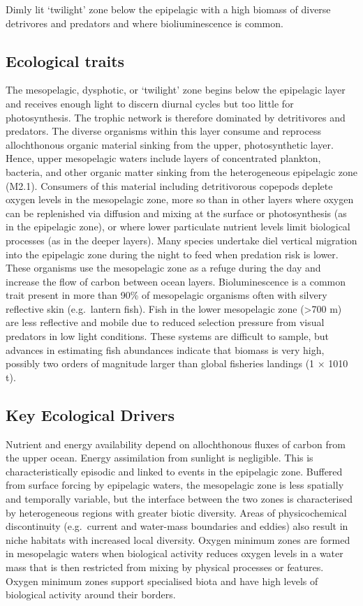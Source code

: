 \documentclass[
  letterpaper,
  DIV=11,
  numbers=noendperiod]{scrartcl}
\begin{document}
Dimly lit `twilight' zone below the epipelagic with a high biomass of
diverse detrivores and predators and where bioliuminescence is common.

\subsection{Ecological traits}\label{ecological-traits-36}

The mesopelagic, dysphotic, or `twilight' zone begins below the
epipelagic layer and receives enough light to discern diurnal cycles but
too little for photosynthesis. The trophic network is therefore
dominated by detritivores and predators. The diverse organisms within
this layer consume and reprocess allochthonous organic material sinking
from the upper, photosynthetic layer. Hence, upper mesopelagic waters
include layers of concentrated plankton, bacteria, and other organic
matter sinking from the heterogeneous epipelagic zone (M2.1). Consumers
of this material including detritivorous copepods deplete oxygen levels
in the mesopelagic zone, more so than in other layers where oxygen can
be replenished via diffusion and mixing at the surface or photosynthesis
(as in the epipelagic zone), or where lower particulate nutrient levels
limit biological processes (as in the deeper layers). Many species
undertake diel vertical migration into the epipelagic zone during the
night to feed when predation risk is lower. These organisms use the
mesopelagic zone as a refuge during the day and increase the flow of
carbon between ocean layers. Bioluminescence is a common trait present
in more than 90\% of mesopelagic organisms often with silvery reflective
skin (e.g.~lantern fish). Fish in the lower mesopelagic zone
(\textgreater700 m) are less reflective and mobile due to reduced
selection pressure from visual predators in low light conditions. These
systems are difficult to sample, but advances in estimating fish
abundances indicate that biomass is very high, possibly two orders of
magnitude larger than global fisheries landings (1 × 1010 t).

\subsection{Key Ecological Drivers}\label{key-ecological-drivers-36}

Nutrient and energy availability depend on allochthonous fluxes of
carbon from the upper ocean. Energy assimilation from sunlight is
negligible. This is characteristically episodic and linked to events in
the epipelagic zone. Buffered from surface forcing by epipelagic waters,
the mesopelagic zone is less spatially and temporally variable, but the
interface between the two zones is characterised by heterogeneous
regions with greater biotic diversity. Areas of physicochemical
discontinuity (e.g.~current and water-mass boundaries and eddies) also
result in niche habitats with increased local diversity. Oxygen minimum
zones are formed in mesopelagic waters when biological activity reduces
oxygen levels in a water mass that is then restricted from mixing by
physical processes or features. Oxygen minimum zones support specialised
biota and have high levels of biological activity around their borders.
\end{document}
